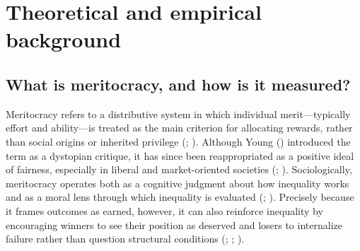 \documentclass[
  13pt,
]{article}
\begin{document}
\section{Theoretical and empirical
background}\label{theoretical-and-empirical-background}

\subsection{What is meritocracy, and how is it
measured?}\label{what-is-meritocracy-and-how-is-it-measured}

Meritocracy refers to a distributive system in which individual
merit---typically effort and ability---is treated as the main criterion
for allocating rewards, rather than social origins or inherited
privilege (;
). Although Young
() introduced the term as a
dystopian critique, it has since been reappropriated as a positive ideal
of fairness, especially in liberal and market-oriented societies
(;
).
Sociologically, meritocracy operates both as a cognitive judgment about
how inequality works and as a moral lens through which inequality is
evaluated (; ).
Precisely because it frames outcomes as earned, however, it can also
reinforce inequality by encouraging winners to see their position as
deserved and losers to internalize failure rather than question
structural conditions
(;
;
).
\end{document}
